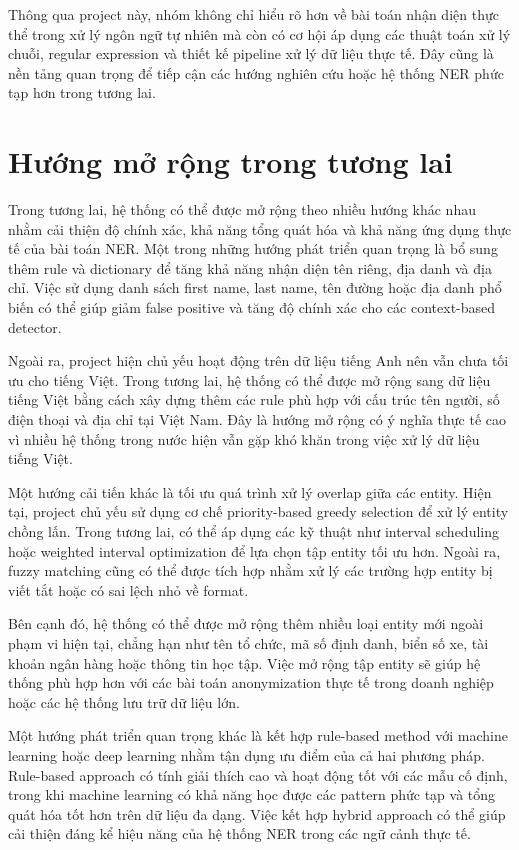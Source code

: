 Thông qua project này, nhóm không chỉ hiểu rõ hơn về bài toán nhận diện thực thể trong xử lý ngôn ngữ tự nhiên mà còn có cơ hội áp dụng các thuật toán xử lý chuỗi, regular expression và thiết kế pipeline xử lý dữ liệu thực tế. Đây cũng là nền tảng quan trọng để tiếp cận các hướng nghiên cứu hoặc hệ thống NER phức tạp hơn trong tương lai.

\section{Hướng mở rộng trong tương lai}

Trong tương lai, hệ thống có thể được mở rộng theo nhiều hướng khác nhau nhằm cải thiện độ chính xác, khả năng tổng quát hóa và khả năng ứng dụng thực tế của bài toán NER. Một trong những hướng phát triển quan trọng là bổ sung thêm rule và dictionary để tăng khả năng nhận diện tên riêng, địa danh và địa chỉ. Việc sử dụng danh sách first name, last name, tên đường hoặc địa danh phổ biến có thể giúp giảm false positive và tăng độ chính xác cho các context-based detector.

Ngoài ra, project hiện chủ yếu hoạt động trên dữ liệu tiếng Anh nên vẫn chưa tối ưu cho tiếng Việt. Trong tương lai, hệ thống có thể được mở rộng sang dữ liệu tiếng Việt bằng cách xây dựng thêm các rule phù hợp với cấu trúc tên người, số điện thoại và địa chỉ tại Việt Nam. Đây là hướng mở rộng có ý nghĩa thực tế cao vì nhiều hệ thống trong nước hiện vẫn gặp khó khăn trong việc xử lý dữ liệu tiếng Việt.

Một hướng cải tiến khác là tối ưu quá trình xử lý overlap giữa các entity. Hiện tại, project chủ yếu sử dụng cơ chế priority-based greedy selection để xử lý entity chồng lấn. Trong tương lai, có thể áp dụng các kỹ thuật như interval scheduling hoặc weighted interval optimization để lựa chọn tập entity tối ưu hơn. Ngoài ra, fuzzy matching cũng có thể được tích hợp nhằm xử lý các trường hợp entity bị viết tắt hoặc có sai lệch nhỏ về format.

Bên cạnh đó, hệ thống có thể được mở rộng thêm nhiều loại entity mới ngoài phạm vi hiện tại, chẳng hạn như tên tổ chức, mã số định danh, biển số xe, tài khoản ngân hàng hoặc thông tin học tập. Việc mở rộng tập entity sẽ giúp hệ thống phù hợp hơn với các bài toán anonymization thực tế trong doanh nghiệp hoặc các hệ thống lưu trữ dữ liệu lớn.

Một hướng phát triển quan trọng khác là kết hợp rule-based method với machine learning hoặc deep learning nhằm tận dụng ưu điểm của cả hai phương pháp. Rule-based approach có tính giải thích cao và hoạt động tốt với các mẫu cố định, trong khi machine learning có khả năng học được các pattern phức tạp và tổng quát hóa tốt hơn trên dữ liệu đa dạng. Việc kết hợp hybrid approach có thể giúp cải thiện đáng kể hiệu năng của hệ thống NER trong các ngữ cảnh thực tế.

